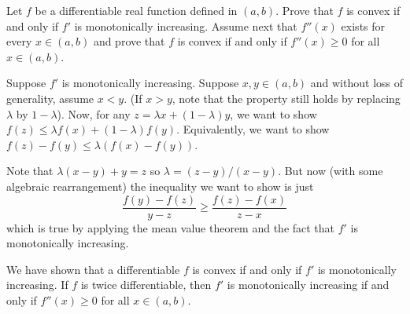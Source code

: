 \documentclass[12 pt, letterpaper]{hmcpset}
\begin{document}
\pagebreak

\begin{problem}
	Let $f$ be a differentiable real function defined in $(a, b)$. Prove that $f$ is convex if and only if $f'$ is monotonically increasing. Assume next that $f''(x)$ exists for every $x \in (a, b)$ and prove that $f$ is convex if and only if $f''(x) \ge 0$ for all $x \in (a, b)$.
\end{problem}

\begin{solution}
	Suppose $f'$ is monotonically increasing. Suppose $x, y \in (a, b)$ and without loss of generality, assume $x < y$. (If $x > y$, note that the property still holds by replacing $\lambda$ by $1 - \lambda$). Now, for any $z = \lambda x + (1 - \lambda) y$, we want to show $f(z) \le \lambda f(x) + (1 - \lambda) f(y)$. Equivalently, we want to show $f(z) - f(y) \le \lambda (f(x) - f(y))$.

	Note that $\lambda(x - y) + y = z$ so $\lambda = (z - y) / (x - y)$. But now (with some algebraic rearrangement) the inequality we want to show is just
	\[
		\frac{f(y) - f(z)}{y - z} \ge \frac{f(z) - f(x)}{z - x}
	\]
	which is true by applying the mean value theorem and the fact that $f'$ is monotonically increasing.

	We have shown that a differentiable $f$ is convex if and only if $f'$ is monotonically increasing. If $f$ is twice differentiable, then $f'$ is monotonically increasing if and only if $f''(x) \ge 0$ for all $x \in (a, b)$.
\end{solution}
\end{document}
